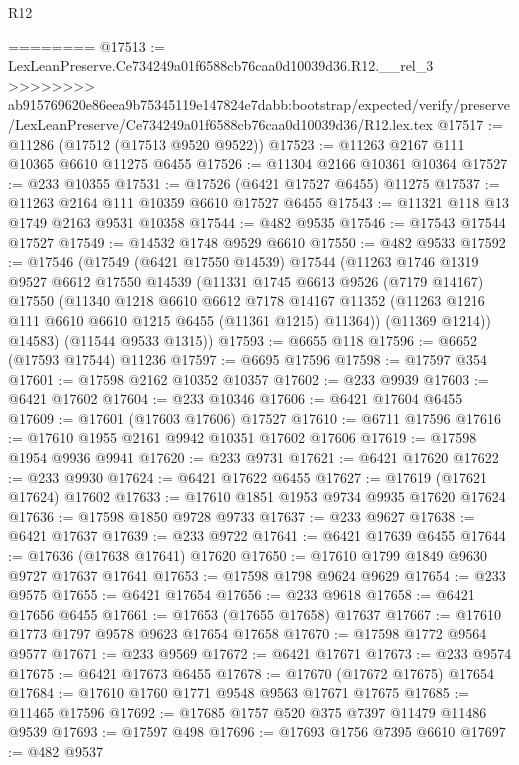 \begin{lexlean}{R12}
\begin{coremodule}
{{{{{{{{{{{{{{{{{{{{{{{{{{{{{{{{{{{{{{{{{{{{{{{{{{{{{{{{{{{{{{{{{{{{{{{{{{{{{{{{{{========
@17513 := LexLeanPreserve.Ce734249a01f6588cb76caa0d10039d36.R12.__rel_3
>>>>>>>> ab915769620e86eea9b75345119e147824e7dabb:bootstrap/expected/verify/preserve/LexLeanPreserve/Ce734249a01f6588cb76caa0d10039d36/R12.lex.tex
@17517 := @11286 (@17512 (@17513 @9520 @9522))
@17523 := @11263 @2167 @111 @10365 @6610 @11275 @6455
@17526 := @11304 @2166 @10361 @10364
@17527 := @233 @10355
@17531 := @17526 (@6421 @17527 @6455) @11275
@17537 := @11263 @2164 @111 @10359 @6610 @17527 @6455
@17543 := @11321 @118 @13 @1749 @2163 @9531 @10358
@17544 := @482 @9535
@17546 := @17543 @17544 @17527
@17549 := @14532 @1748 @9529 @6610
@17550 := @482 @9533
@17592 := @17546
    (@17549
      (@6421 @17550 @14539)
      @17544
      (@11263
        @1746
        @1319
        @9527
        @6612
        @17550
        @14539
        (@11331
          @1745
          @6613
          @9526
          (@7179 @14167)
          @17550
          (@11340
            @1218
            @6610
            @6612
            @7178
            @14167
            @11352
            (@11263 @1216 @111 @6610 @6610 @1215 @6455 (@11361 @1215) @11364))
          (@11369 @1214))
        @14583)
      (@11544 @9533 @1315))
@17593 := @6655 @118
@17596 := @6652 (@17593 @17544) @11236
@17597 := @6695 @17596
@17598 := @17597 @354
@17601 := @17598 @2162 @10352 @10357
@17602 := @233 @9939
@17603 := @6421 @17602
@17604 := @233 @10346
@17606 := @6421 @17604 @6455
@17609 := @17601 (@17603 @17606) @17527
@17610 := @6711 @17596
@17616 := @17610 @1955 @2161 @9942 @10351 @17602 @17606
@17619 := @17598 @1954 @9936 @9941
@17620 := @233 @9731
@17621 := @6421 @17620
@17622 := @233 @9930
@17624 := @6421 @17622 @6455
@17627 := @17619 (@17621 @17624) @17602
@17633 := @17610 @1851 @1953 @9734 @9935 @17620 @17624
@17636 := @17598 @1850 @9728 @9733
@17637 := @233 @9627
@17638 := @6421 @17637
@17639 := @233 @9722
@17641 := @6421 @17639 @6455
@17644 := @17636 (@17638 @17641) @17620
@17650 := @17610 @1799 @1849 @9630 @9727 @17637 @17641
@17653 := @17598 @1798 @9624 @9629
@17654 := @233 @9575
@17655 := @6421 @17654
@17656 := @233 @9618
@17658 := @6421 @17656 @6455
@17661 := @17653 (@17655 @17658) @17637
@17667 := @17610 @1773 @1797 @9578 @9623 @17654 @17658
@17670 := @17598 @1772 @9564 @9577
@17671 := @233 @9569
@17672 := @6421 @17671
@17673 := @233 @9574
@17675 := @6421 @17673 @6455
@17678 := @17670 (@17672 @17675) @17654
@17684 := @17610 @1760 @1771 @9548 @9563 @17671 @17675
@17685 := @11465 @17596
@17692 := @17685 @1757 @520 @375 @7397 @11479 @11486 @9539
@17693 := @17597 @498
@17696 := @17693 @1756 @7395 @6610
@17697 := @482 @9537
}}}}}}}}}}}}}}}}}}}}}}}}}}}}}}}}}}}}}}}}}}}}}}}}}}}}}}}}}}}}}}}}}}}}}}}}}}}}}}}}}}
\end{coremodule}
\end{lexlean}

